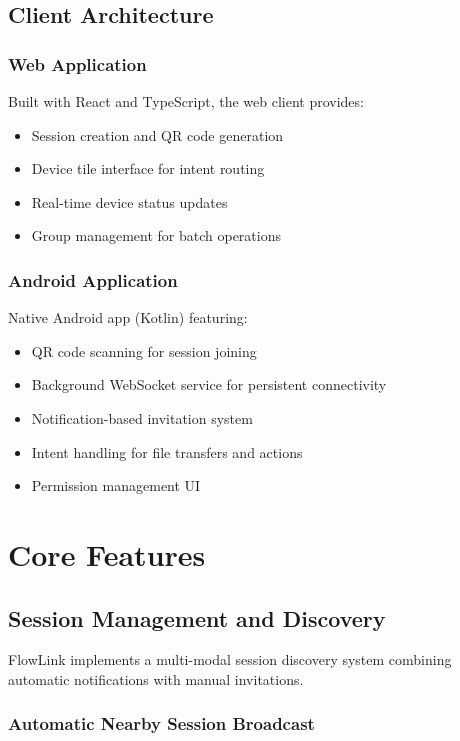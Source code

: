 \documentclass[conference]{IEEEtran}
\begin{document}
\subsection{Client Architecture}

\subsubsection{Web Application}

Built with React and TypeScript, the web client provides:
\begin{itemize}
    \item Session creation and QR code generation
    \item Device tile interface for intent routing
    \item Real-time device status updates
    \item Group management for batch operations
\end{itemize}

\subsubsection{Android Application}

Native Android app (Kotlin) featuring:
\begin{itemize}
    \item QR code scanning for session joining
    \item Background WebSocket service for persistent connectivity
    \item Notification-based invitation system
    \item Intent handling for file transfers and actions
    \item Permission management UI
\end{itemize}

\section{Core Features}

\subsection{Session Management and Discovery}

FlowLink implements a multi-modal session discovery system combining automatic notifications with manual invitations.

\subsubsection{Automatic Nearby Session Broadcast}
\end{document}
